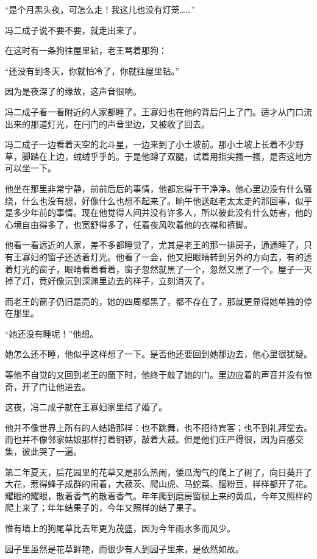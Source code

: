 \par “是个月黑头夜，可怎么走！我这儿也没有灯笼……”
\par 冯二成子说不要不要，就走出来了。
\par 在这时有一条狗往屋里钻，老王骂着那狗：
\par “还没有到冬天，你就怕冷了，你就往屋里钻。”
\par 因为是夜深了的缘故，这声音很响。
\par 冯二成子看一看附近的人家都睡了。王寡妇也在他的背后闩上了门。适才从门口流出来的那道灯光，在闩门的声音里边，又被收了回去。
\par 冯二成子一边看着天空的北斗星，一边来到了小土坡前。那小土坡上长着不少野草，脚踏在上边，绒绒乎乎的。于是他蹲了双腿，试着用指尖搔一搔，是否这地方可以坐一下。
\par 他坐在那里非常宁静，前前后后的事情，他都忘得干干净净。他心里边没有什么骚绕，什么也没有想，好像什么也想不起来了。晌午他送赵老太太走的那回事，似乎是多少年前的事情。现在他觉得人间并没有许多人，所以彼此没有什么妨害，他的心境自由得多了，也宽舒得多了，任着夜风吹着他的衣襟和裤脚。
\par 他看一看远近的人家，差不多都睡觉了，尤其是老王的那一排房子，通通睡了，只有王寡妇的窗子还透着灯光。他看了一会，他又把眼睛转到另外的方向去，有的透着灯光的窗子，眼睛看着看着，窗子忽然就黑了一个，忽然又黑了一个。屋子一灭掉了灯，竟好像沉到深渊里边去的样子，立刻消灭了。
\par 而老王的窗子仍旧是亮的，她的四周都黑了，都不存在了，那就更显得她单独的停在那里。
\par “她还没有睡呢！”他想。
\par 她怎么还不睡，他似乎这样想了一下。是否他还要回到她那边去，他心里很犹疑。
\par 等他不自觉的又回到老王的窗下时，他终于敲了她的门。里边应着的声音并没有惊奇，开了门让他进去。
\par 这夜，冯二成子就在王寡妇家里结了婚了。
\par 他并不像世界上所有的人结婚那样：也不跳舞，也不招待宾客；也不到礼拜堂去。而也并不像邻家姑娘那样打着铜锣，敲着大鼓。但是他们庄严得很，因为百感交集，彼此哭了一遍。
\par 第二年夏天，后花园里的花草又是那么热闹，倭瓜淘气的爬上了树了，向日葵开了大花，惹得蜂子成群的闹着，大菽茨、爬山虎、马蛇菜、胭粉豆，样样都开了花。耀眼的耀眼，散着香气的散着香气。年年爬到磨房窗棂上来的黄瓜，今年又照样的爬上来了；年年结果子的，今年又照样的结了果子。
\par 惟有墙上的狗尾草比去年更为茂盛，因为今年雨水多而风少。
\par 园子里虽然是花草鲜艳，而很少有人到园子里来，是依然如故。
